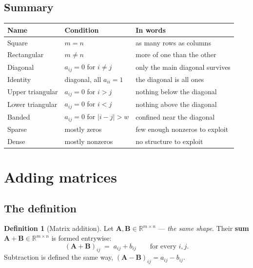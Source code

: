 \documentclass[11pt]{article}
\theoremstyle{plain}
\theoremstyle{definition}
\newtheorem{defn}{Definition}[section]
\theoremstyle{remark}
\newcommand{\R}{\mathbb{R}}
\newcommand{\mt}[1]{\mathbf{#1}}        %
\begin{document}
\subsection{Summary}
\begin{center}
\renewcommand{\arraystretch}{1.35}
\begin{tabular}{@{}l l p{6.5cm}@{}}
\toprule
\textbf{Name} & \textbf{Condition} & \textbf{In words} \\
\midrule
Square      & $m=n$                       & as many rows as columns \\
Rectangular & $m\neq n$                   & more of one than the other \\
Diagonal    & $a_{ij}=0$ for $i\neq j$    & only the main diagonal survives \\
Identity    & diagonal, all $a_{ii}=1$    & the diagonal is all ones \\
Upper triangular & $a_{ij}=0$ for $i>j$   & nothing below the diagonal \\
Lower triangular & $a_{ij}=0$ for $i<j$   & nothing above the diagonal \\
Banded      & $a_{ij}=0$ for $|i-j|>w$    & confined near the diagonal \\
Sparse      & mostly zeros                & few enough nonzeros to exploit \\
Dense       & mostly nonzeros             & no structure to exploit \\
\bottomrule
\end{tabular}
\end{center}

\section{Adding matrices}

\subsection{The definition}
\begin{defn}[Matrix addition]
Let $\mt{A},\mt{B}\in\R^{m\times n}$ --- \emph{the same shape}. Their
\textbf{sum} $\mt{A}+\mt{B}\in\R^{m\times n}$ is formed entrywise:
\[
  (\mt{A}+\mt{B})_{ij} \;=\; a_{ij}+b_{ij}
  \qquad\text{for every } i,j .
\]
Subtraction is defined the same way, $(\mt{A}-\mt{B})_{ij}=a_{ij}-b_{ij}$.
\end{defn}
\end{document}
